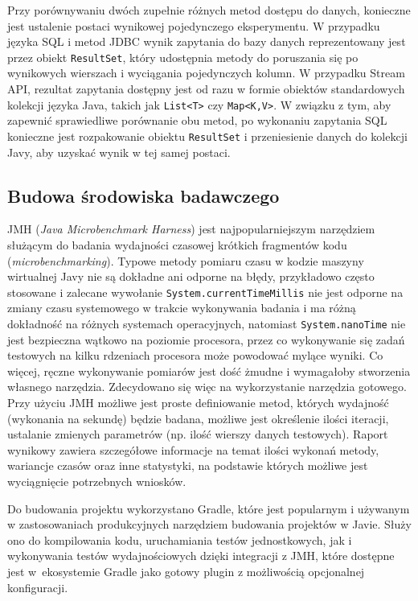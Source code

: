 \documentclass[12pt,twoside,openright]{extarticle}
\begin{document}
    Przy porównywaniu dwóch zupełnie różnych metod dostępu do danych, konieczne jest ustalenie postaci wynikowej pojedynczego eksperymentu. W przypadku języka SQL i metod JDBC wynik zapytania do bazy danych reprezentowany jest przez obiekt \texttt{ResultSet}, który udostępnia metody do poruszania się po wynikowych wierszach i wyciągania pojedynczych kolumn. W przypadku Stream API, rezultat zapytania dostępny jest od razu w formie obiektów standardowych kolekcji języka Java, takich jak \texttt{List<T>} czy \texttt{Map<K,V>}. W związku z tym, aby zapewnić sprawiedliwe porównanie obu metod, po wykonaniu zapytania SQL konieczne jest rozpakowanie obiektu \texttt{ResultSet} i przeniesienie danych do kolekcji Javy, aby uzyskać wynik w tej samej postaci.

\subsection{Budowa środowiska badawczego}

    JMH (\textit{Java Microbenchmark Harness}) jest najpopularniejszym narzędziem służącym do badania wydajności czasowej krótkich fragmentów kodu (\textit{microbenchmarking}). Typowe metody pomiaru czasu w kodzie maszyny wirtualnej Javy nie są dokładne ani odporne na błędy, przykładowo często stosowane i zalecane wywołanie \texttt{System.currentTimeMillis} nie jest odporne na zmiany czasu systemowego w trakcie wykonywania badania i ma różną dokładność na różnych systemach operacyjnych, natomiast \texttt{System.nanoTime} nie jest bezpieczna wątkowo na poziomie procesora, przez co wykonywanie się zadań testowych na kilku rdzeniach procesora może powodować mylące wyniki. Co więcej, ręczne wykonywanie pomiarów jest dość żmudne i wymagałoby stworzenia własnego narzędzia. Zdecydowano się więc na wykorzystanie narzędzia gotowego. Przy użyciu JMH możliwe jest proste definiowanie metod, których wydajność (wykonania na sekundę) będzie badana, możliwe jest określenie ilości iteracji, ustalanie zmienych parametrów (np. ilość wierszy danych testowych). Raport wynikowy zawiera szczegółowe informacje na temat ilości wykonań metody, wariancje czasów oraz inne statystyki, na podstawie których możliwe jest wyciągnięcie potrzebnych wniosków.

    Do budowania projektu wykorzystano Gradle, które jest popularnym i używanym w zastosowaniach produkcyjnych narzędziem budowania projektów w Javie. Służy ono do kompilowania kodu, uruchamiania testów jednostkowych, jak i wykonywania testów wydajnościowych dzięki integracji z JMH, które dostępne jest w~ekosystemie Gradle jako gotowy plugin z możliwością opcjonalnej konfiguracji.
\end{document}
